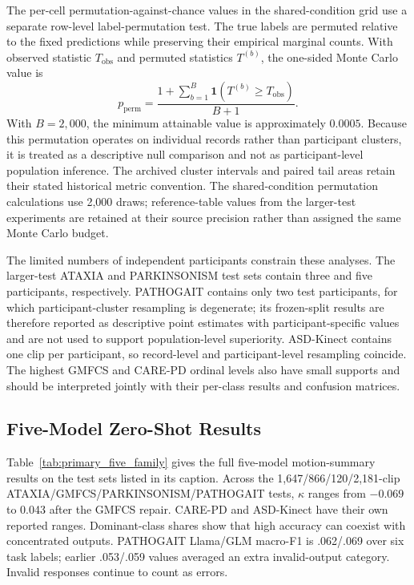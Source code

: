 The per-cell permutation-against-chance values in the shared-condition grid
use a separate row-level label-permutation test. The true labels are
permuted relative to the fixed predictions while preserving their
empirical marginal counts. With observed statistic $T_{\mathrm{obs}}$
and permuted statistics $T^{(b)}$, the one-sided Monte Carlo value is
\begin{equation}
p_{\mathrm{perm}}
  =\frac{1+\sum_{b=1}^{B}
       \mathbf{1}\!\left(T^{(b)}\geq T_{\mathrm{obs}}\right)}
       {B+1}.
\end{equation}
With $B=2{,}000$, the minimum attainable value is approximately
$0.0005$. Because this permutation operates on individual records
rather than participant clusters, it is treated as a descriptive null
comparison and not as participant-level population inference. The archived cluster intervals and paired tail areas retain their stated historical metric convention. The shared-condition permutation calculations use 2,000 draws; reference-table values from the larger-test experiments are retained at their source precision rather than assigned the same Monte Carlo budget.

The limited numbers of independent participants constrain these
analyses. The larger-test ATAXIA and PARKINSONISM test sets contain three and
five participants, respectively. PATHOGAIT contains only two test
participants, for which participant-cluster resampling is degenerate;
its frozen-split results are therefore reported as descriptive point
estimates with participant-specific values and are not used to support
population-level superiority. ASD-Kinect contains one clip per
participant, so record-level and participant-level resampling coincide.
The highest GMFCS and CARE-PD ordinal levels also have small supports
and should be interpreted jointly with their per-class results and
confusion matrices.

\subsection{Five-Model Zero-Shot Results}
\label{sec:supp_primary_zero}

Table~\ref{tab:primary_five_family} gives the full five-model motion-summary results on the test sets listed in its caption. Across the 1,647/866/120/2,181-clip ATAXIA/GMFCS/PARKINSONISM/PATHOGAIT tests, $\kappa$ ranges from $-0.069$ to 0.043 after the GMFCS repair. CARE-PD and ASD-Kinect have their own reported ranges. Dominant-class shares show that high accuracy can coexist with concentrated outputs. PATHOGAIT Llama/GLM macro-F1 is .062/.069 over six task labels; earlier .053/.059 values averaged an extra invalid-output category. Invalid responses continue to count as errors.

